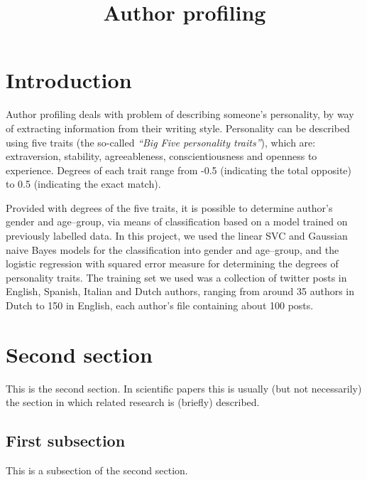 \documentclass[10pt, a4paper]{article}
\title{Author profiling}
\begin{document}
\maketitleabstract

\section{Introduction}

Author profiling deals with problem of describing someone's personality, by way of extracting information from their writing style.
Personality can be described using five traits (the so-called \textit{``Big Five personality traits''}), which are: extraversion, stability, agreeableness, conscientiousness and openness to experience.
Degrees of each trait range from -0.5 (indicating the total opposite) to 0.5 (indicating the exact match).

Provided with degrees of the five traits, it is possible to determine author's gender and age--group, via means of classification based on a model trained on previously labelled data.
In this project, we used the linear SVC and Gaussian naive Bayes models for the classification into gender and age--group, and the logistic regression with squared error measure for determining the degrees of personality traits.
The training set we used was a collection of twitter posts in English, Spanish, Italian and Dutch authors, ranging from around 35 authors in Dutch to 150 in English, each author's file containing about 100 posts.

\section{Second section}

This is the second section. In scientific papers this is usually (but not necessarily) the section in which related research is (briefly) described. 

\subsection{First subsection}
\label{sec:first}

This is a subsection of the second section.
\end{document}
